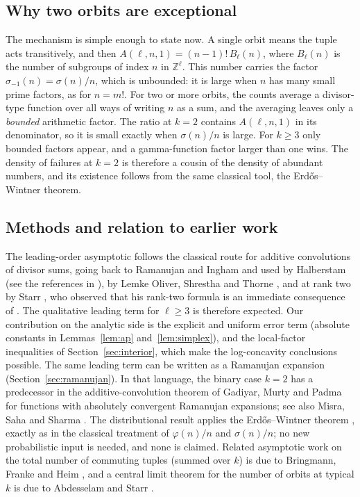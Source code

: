 \documentclass[11pt,a4paper]{article}
\theoremstyle{remark}
\numberwithin{equation}{section}
\begin{document}
\subsection{Why two orbits are exceptional}
The mechanism is simple enough to state now. A single orbit means the tuple acts transitively, and then $A(\ell,n,1)=(n-1)!\,B_\ell(n)$, where $B_\ell(n)$ is the number of subgroups of index $n$ in $\mathbb Z^\ell$. This number carries the factor $\sigma_{-1}(n)=\sigma(n)/n$, which is unbounded: it is large when $n$ has many small prime factors, as for $n=m!$. For two or more orbits, the counts average a divisor-type function over all ways of writing $n$ as a sum, and the averaging leaves only a \emph{bounded} arithmetic factor. The ratio at $k=2$ contains $A(\ell,n,1)$ in its denominator, so it is small exactly when $\sigma(n)/n$ is large. For $k\ge3$ only bounded factors appear, and a gamma-function factor larger than one wins. The density of failures at $k=2$ is therefore a cousin of the density of abundant numbers, and its existence follows from the same classical tool, the Erd\H{o}s--Wintner theorem.

\subsection{Methods and relation to earlier work}
The leading-order asymptotic follows the classical route for additive convolutions of divisor sums, going back to Ramanujan and Ingham and used by Halberstam (see the references in \cite{LOST,Starr2026a}), by Lemke Oliver, Shrestha and Thorne \cite{LOST}, and at rank two by Starr \cite{Starr2026a}, who observed that his rank-two formula is an immediate consequence of \cite{LOST}. The qualitative leading term for $\ell\ge3$ is therefore expected. Our contribution on the analytic side is the explicit and uniform error term (absolute constants in Lemmas~\ref{lem:ap} and~\ref{lem:simplex}), and the local-factor inequalities of Section~\ref{sec:interior}, which make the log-concavity conclusions possible. The same leading term can be written as a Ramanujan expansion (Section~\ref{sec:ramanujan}). In that language, the binary case $k=2$ has a predecessor in the additive-convolution theorem of Gadiyar, Murty and Padma \cite[Theorem~10]{GMP} for functions with absolutely convergent Ramanujan expansions; see also Misra, Saha and Sharma \cite{MSS}. The distributional result applies the Erd\H{o}s--Wintner theorem \cite{ErdosWintner,TenenbaumVerwee}, exactly as in the classical treatment of $\varphi(n)/n$ and $\sigma(n)/n$; no new probabilistic input is needed, and none is claimed. Related asymptotic work on the total number of commuting tuples (summed over $k$) is due to Bringmann, Franke and Heim \cite{BFH}, and a central limit theorem for the number of orbits at typical $k$ is due to Abdesselam and Starr \cite{AbdesselamStarr}.
\end{document}
